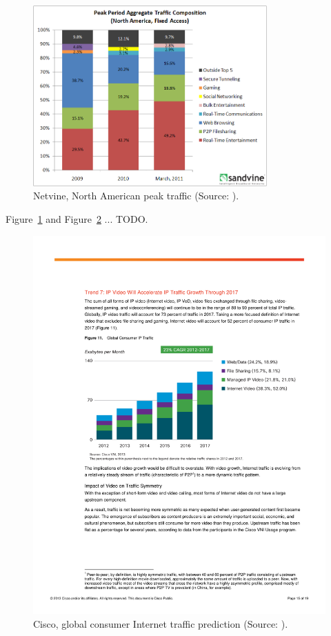 \begin{figure}[htbp]
    \centering
    \includegraphics[width=0.8\textwidth]{images/netvine.png}
    \caption{Netvine, North American peak traffic (Source: \cite{sandvine_spring2011,sandvine_spring2013}).}
    \label{c1:fig:traffic_netvine}
\end{figure}

Figure~\ref{c1:fig:traffic_netvine} and Figure~\ref{c1:fig:traffic_cisco} ... TODO.

\begin{figure}[htbp]
    \centering
    \includegraphics[width=\textwidth]{images/VNI_Hyperconnectivity_WP.pdf}
    \caption{Cisco, global consumer Internet traffic prediction (Source: \cite{cisco2013VNI}).}
	\label{c1:fig:traffic_cisco}
\end{figure}


